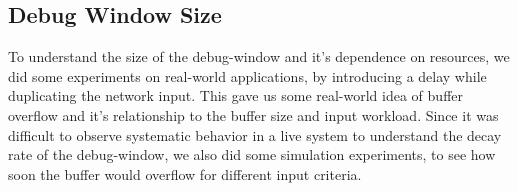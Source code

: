 \subsection{Debug Window Size}
\label{sec:timewindowPerformance}

To understand the size of the debug-window and it's dependence on resources, we did some experiments on real-world applications, by introducing a delay while duplicating the network input.
This gave us some real-world idea of buffer overflow and it's relationship to the buffer size and input workload.
Since it was difficult to observe systematic behavior in a live system to understand the decay rate of the debug-window, we also did some simulation experiments, to see how soon the buffer would overflow for different input criteria.

